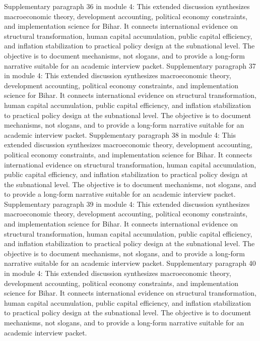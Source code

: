 \documentclass[preprint,12pt]{elsarticle}
\begin{document}
Supplementary paragraph 36 in module 4: This extended discussion synthesizes macroeconomic theory, development accounting, political economy constraints, and implementation science for Bihar. It connects international evidence on structural transformation, human capital accumulation, public capital efficiency, and inflation stabilization to practical policy design at the subnational level. The objective is to document mechanisms, not slogans, and to provide a long-form narrative suitable for an academic interview packet.
Supplementary paragraph 37 in module 4: This extended discussion synthesizes macroeconomic theory, development accounting, political economy constraints, and implementation science for Bihar. It connects international evidence on structural transformation, human capital accumulation, public capital efficiency, and inflation stabilization to practical policy design at the subnational level. The objective is to document mechanisms, not slogans, and to provide a long-form narrative suitable for an academic interview packet.
Supplementary paragraph 38 in module 4: This extended discussion synthesizes macroeconomic theory, development accounting, political economy constraints, and implementation science for Bihar. It connects international evidence on structural transformation, human capital accumulation, public capital efficiency, and inflation stabilization to practical policy design at the subnational level. The objective is to document mechanisms, not slogans, and to provide a long-form narrative suitable for an academic interview packet.
Supplementary paragraph 39 in module 4: This extended discussion synthesizes macroeconomic theory, development accounting, political economy constraints, and implementation science for Bihar. It connects international evidence on structural transformation, human capital accumulation, public capital efficiency, and inflation stabilization to practical policy design at the subnational level. The objective is to document mechanisms, not slogans, and to provide a long-form narrative suitable for an academic interview packet.
Supplementary paragraph 40 in module 4: This extended discussion synthesizes macroeconomic theory, development accounting, political economy constraints, and implementation science for Bihar. It connects international evidence on structural transformation, human capital accumulation, public capital efficiency, and inflation stabilization to practical policy design at the subnational level. The objective is to document mechanisms, not slogans, and to provide a long-form narrative suitable for an academic interview packet.
\end{document}
